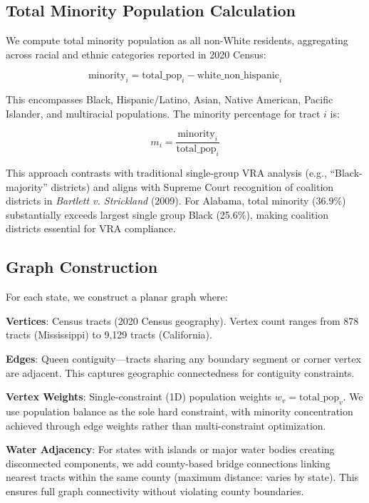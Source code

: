 \subsection{Total Minority Population Calculation}

We compute total minority population as all non-White residents, aggregating across racial and ethnic categories reported in 2020 Census:

\begin{equation}
\text{minority}_i = \text{total\_pop}_i - \text{white\_non\_hispanic}_i
\end{equation}

This encompasses Black, Hispanic/Latino, Asian, Native American, Pacific Islander, and multiracial populations. The minority percentage for tract $i$ is:

\begin{equation}
m_i = \frac{\text{minority}_i}{\text{total\_pop}_i}
\end{equation}

This approach contrasts with traditional single-group VRA analysis (e.g., ``Black-majority'' districts) and aligns with Supreme Court recognition of coalition districts in \textit{Bartlett v. Strickland} (2009). For Alabama, total minority (36.9\%) substantially exceeds largest single group Black (25.6\%), making coalition districts essential for VRA compliance.

\subsection{Graph Construction}

For each state, we construct a planar graph where:

\textbf{Vertices}: Census tracts (2020 Census geography). Vertex count ranges from 878 tracts (Mississippi) to 9,129 tracts (California).

\textbf{Edges}: Queen contiguity—tracts sharing any boundary segment or corner vertex are adjacent. This captures geographic connectedness for contiguity constraints.

\textbf{Vertex Weights}: Single-constraint (1D) population weights $w_v = \text{total\_pop}_v$. We use population balance as the sole hard constraint, with minority concentration achieved through edge weights rather than multi-constraint optimization.

\textbf{Water Adjacency}: For states with islands or major water bodies creating disconnected components, we add county-based bridge connections linking nearest tracts within the same county (maximum distance: varies by state). This ensures full graph connectivity without violating county boundaries.


